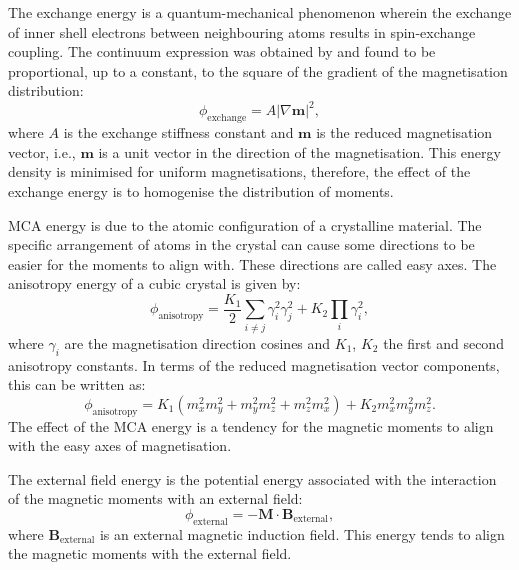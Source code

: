 The exchange energy is a quantum-mechanical phenomenon wherein the exchange of inner shell electrons between neighbouring atoms results in spin-exchange coupling. The continuum expression was obtained by \citet{Landau1935} and found to be proportional, up to a constant, to the square of the gradient of the magnetisation distribution:
\begin{equation}
\phi_{\text{exchange}} = A | \nabla \boldsymbol{m} |^2,
\end{equation}
where $A$ is the exchange stiffness constant and $\boldsymbol{m}$ is the reduced magnetisation vector, i.e., $\boldsymbol{m}$ is a unit vector in the direction of the magnetisation. This energy density is minimised for uniform magnetisations, therefore, the effect of the exchange energy is to homogenise the distribution of moments.\par

MCA energy is due to the atomic configuration of a crystalline material. The specific arrangement of atoms in the crystal can cause some directions to be easier for the moments to align with. These directions are called easy axes. The anisotropy energy of a cubic crystal is given by:
\begin{equation}
\phi_{\text{anisotropy}}=\frac{K_1}{2}\sum_{i\neq j}\gamma_i^2\gamma_j^2 + K_2\prod_i\gamma_i^2,
\end{equation}
where $\gamma_i$ are the magnetisation direction cosines and $K_1$, $K_2$ the first and second anisotropy constants. In terms of the reduced magnetisation vector components, this can be written as:
\begin{equation}
\phi_{\text{anisotropy}}=K_1(m_x^2m_y^2+m_y^2m_z^2+m_z^2m_x^2) + K_2m_x^2m_y^2m_z^2.
\end{equation}
The effect of the MCA energy is a tendency for the magnetic moments to align with the easy axes of magnetisation.\par

The external field energy is the potential energy associated with the interaction of the magnetic moments with an external field:
\begin{equation}
\phi_{\text{external}} = -\boldsymbol{M} \cdot \boldsymbol{B}_{\text{external}},
\end{equation}
where $\boldsymbol{B}_{\text{external}}$ is an external magnetic induction field. This energy tends to align the magnetic moments with the external field.\par


